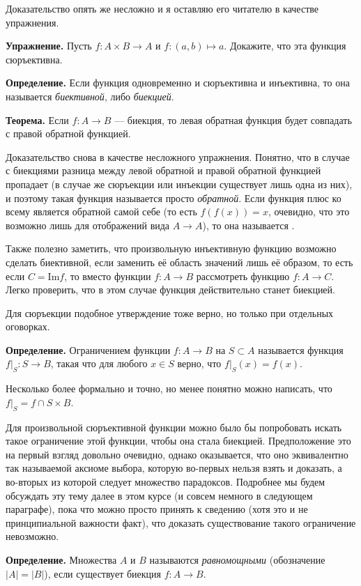 Доказательство опять же несложно и я оставляю его читателю в качестве упражнения.

{\bfseries Упражнение.} Пусть $f:A \times B \to A$ и $f: (a, b)\mapsto a$. Докажите, что эта функция сюръективна.

{\bfseries Определение.} Если функция одновременно и сюръективна и инъективна, то она называется {\slshape биективной}, либо {\slshape биекцией}.

{\bfseries Теорема.} Если $f: A\to B$ — биекция, то левая обратная функция будет совпадать с правой обратной функцией.

Доказательство снова в качестве несложного упражнения. Понятно, что в случае с биекциями разница между левой обратной и правой обратной функцией пропадает (в случае же сюръекции или инъекции существует лишь одна из них), и поэтому такая функция называется просто {\slshape обратной}. Если функция плюс ко всему является обратной самой себе (то есть $f(f(x)) = x$, очевидно, что это возможно лишь для отображений вида $A\to A$), то она называется .

Также полезно заметить, что произвольную инъективную функцию возможно сделать биективной, если заменить её область значений лишь её образом, то есть если $C = \mathrm{Im} f$, то вместо функции $f: A\to B$ рассмотреть функцию $f: A \to C$. Легко проверить, что в этом случае функция действительно станет биекцией.

Для сюръекции подобное утверждение тоже верно, но только при отдельных оговорках.

{\bfseries Определение.} Ограничением функции $f: A\to B$ на $S\subset A$ называется функция $f|_S: S\to B$, такая что для любого $x\in S$ верно, что $f|_S(x) = f(x)$.

Несколько более формально и точно, но менее понятно можно написать, что $f|_S = f \cap S \times B$.

Для произвольной сюръективной функции можно было бы попробовать искать такое ограничение этой функции, чтобы она стала биекцией. Предположение это на первый взгляд довольно очевидно, однако оказывается, что оно эквивалентно так называемой аксиоме выбора, которую во-первых нельзя взять и доказать, а во-вторых из которой следует множество парадоксов. Подробнее мы будем обсуждать эту тему далее в этом курсе (и совсем немного в следующем параграфе), пока что можно просто принять к сведению (хотя это и не принципиальной важности факт), что доказать существование такого ограничение невозможно.

{\bfseries Определение.} Множества $A$ и $B$ называются {\slshape равномощными} (обозначение $|A| = |B|$), если существует биекция $f: A\to B$.

